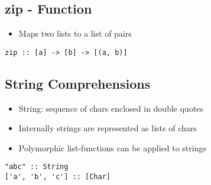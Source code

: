 \subsection{zip - Function}
\begin{itemize}
    \item Maps two lists to a list of pairs
\end{itemize}
\begin{lstlisting}
zip :: [a] -> [b] -> [(a, b)]
\end{lstlisting}

\subsection{String Comprehensions}
\begin{itemize}
    \item String: sequence of chars enclosed in double quotes
    \item Internally strings are represented as lists of chars
    \item Polymorphic list-functions can be applied to strings
\end{itemize}
\begin{lstlisting}
"abc" :: String
['a', 'b', 'c'] :: [Char]
\end{lstlisting}